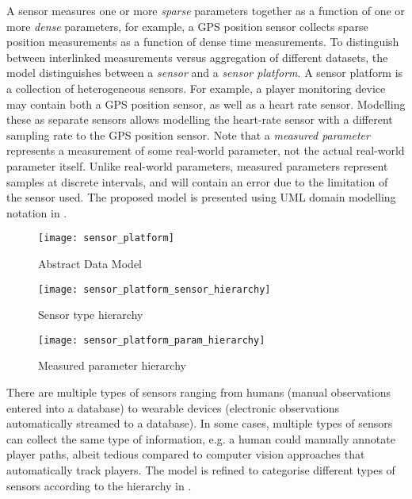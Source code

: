 A sensor measures one or more \emph{sparse} parameters together as a
function of one or more \emph{dense} parameters, for example, a GPS
position sensor collects sparse position measurements as a function of
dense time measurements. To distinguish between interlinked measurements
versus aggregation of different datasets, the model distinguishes between a
\emph{sensor} and a \emph{sensor platform}. A sensor platform is a
collection of heterogeneous sensors. For example, a player monitoring
device may contain both a GPS position sensor, as well as a heart rate
sensor. Modelling these as separate sensors allows modelling the
heart-rate sensor with a different sampling rate to the GPS position
sensor. Note that a \emph{measured parameter} represents a measurement
of some real-world parameter, not the actual real-world parameter
itself. Unlike real-world parameters, measured parameters represent
samples at discrete intervals, and will contain an error due to the
limitation of the sensor used. The proposed model is presented using UML domain
modelling notation in .

\begin{figure}[htbp]
\centering
\texttt{[image: sensor\_platform]}
\caption{Abstract Data Model \label{fig:sensor_platform}}
\end{figure}

\begin{figure}[htbp]
\centering
\texttt{[image: sensor\_platform\_sensor\_hierarchy]}
\caption{Sensor type hierarchy \label{fig:sensor_platform_sensor_hierarchy}}
\end{figure}

\begin{figure}[htb!]
\centering
\texttt{[image: sensor\_platform\_param\_hierarchy]}
\caption{Measured parameter hierarchy \label{fig:sensor_platform_param_hierarchy}}
\end{figure}

There are multiple types of sensors ranging from humans (manual observations entered into a database) to wearable devices (electronic observations automatically streamed to a database). In some cases, multiple types of sensors can collect the same type of information, e.g. a human could manually annotate player paths, albeit tedious compared to computer vision approaches that automatically track players. The model is refined to categorise different types of sensors according to the hierarchy in .

